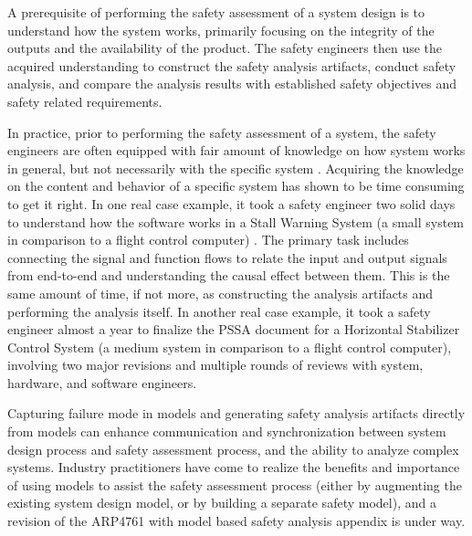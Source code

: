 A prerequisite of performing the safety assessment of a system design is to understand how the system works, primarily focusing on the integrity of the outputs and the availability of the product. The safety engineers then use the acquired understanding to construct the safety analysis artifacts, conduct safety analysis, and compare the analysis results with established safety objectives and safety related requirements.

In practice, prior to performing the safety assessment of a system, the safety engineers are often equipped with fair amount of knowledge on how system works in general, but not necessarily with the specific system .  Acquiring the knowledge on the content and behavior of a specific system has shown to be time consuming to get it right. In one real case example, it took a safety engineer two solid days to understand how the software works in a Stall Warning System (a small system in comparison to a flight control computer) .    The primary task includes connecting the signal and function flows to relate the input and output signals from end-to-end and understanding the causal effect between them. This is the same amount of time, if not more, as constructing the analysis artifacts and performing the analysis itself. In another real case example, it took a safety engineer almost a year to finalize the PSSA document for a Horizontal Stabilizer Control System (a medium system in comparison to a flight control computer), involving two major revisions and multiple rounds of reviews with system, hardware, and software engineers.

Capturing failure mode in models and generating safety analysis artifacts directly from models can enhance communication and synchronization between system design process and safety assessment process, and the ability to analyze complex systems. Industry practitioners have come to realize the benefits and importance of
using models to assist the safety assessment process (either by augmenting the existing system design model, or by building a separate safety model), and a revision of the ARP4761 with model based safety analysis appendix is under way.

